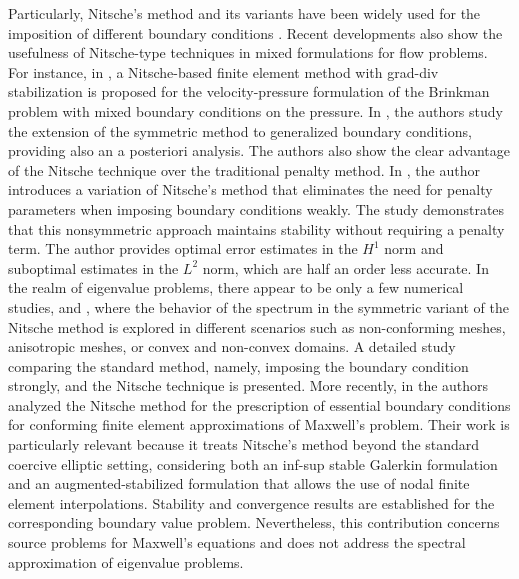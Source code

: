 \documentclass[onefignum,onetabnum,final]{siamart250211}
\numberwithin{equation}{section}
\newcommand\0{\boldsymbol{0}}
\begin{document}
	
	Particularly, Nitsche's method and its variants have been widely used for the imposition of different boundary conditions \cite{chouly2024finite}. Recent developments also show the usefulness of Nitsche-type techniques in mixed formulations for flow problems. For instance, in \cite{anaya2026nitsche}, a Nitsche-based finite element method with grad-div stabilization is proposed for the velocity-pressure formulation of the Brinkman problem with mixed boundary conditions on the pressure. In \cite{juntunen2009nitsche}, the authors study the extension of the symmetric method to generalized boundary conditions, providing also an a posteriori analysis. The authors also show the clear advantage of the Nitsche technique over the traditional penalty method. In \cite{burman2012penalty}, the author introduces a variation of Nitsche's method that eliminates the need for penalty parameters when imposing boundary conditions weakly. The study demonstrates that this nonsymmetric approach maintains stability without requiring a penalty term. The author provides optimal error estimates in the $H^1$ norm and suboptimal estimates in the $L^2$ norm, which are half an order less accurate.  In the realm of eigenvalue problems, there appear to be only a few numerical studies, \cite{harari2018spectral} and \cite{albocher2021spectral}, where the behavior of the spectrum in the symmetric variant of the Nitsche method is explored in different scenarios such as non-conforming meshes, anisotropic meshes, or convex and non-convex domains. A detailed study comparing the standard method, namely, imposing the boundary condition strongly, and the Nitsche technique is presented. More recently, in \cite{boffi2026maxwell-nitsche} the authors analyzed the Nitsche method for the prescription of essential boundary conditions for conforming finite element approximations of Maxwell's problem. Their work is particularly relevant because it treats Nitsche's method beyond the standard coercive elliptic setting, considering both an inf-sup stable Galerkin formulation and an augmented-stabilized formulation that allows the use of nodal finite element interpolations. Stability and convergence results are established for the corresponding boundary value problem. Nevertheless, this contribution concerns source problems for Maxwell's equations and does not address the spectral approximation of eigenvalue problems.
	
\end{document}
